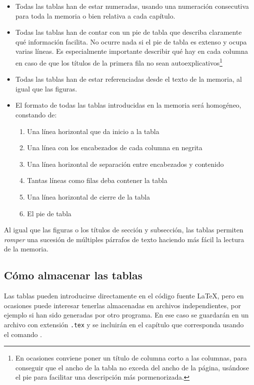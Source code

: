 \begin{itemize}
    \item Todas las tablas han de estar numeradas, usando una numeración consecutiva para toda la memoria o bien relativa a cada capítulo.
    
    \item Todas las tablas han de contar con un pie de tabla que describa claramente qué información facilita. No ocurre nada si el pie de tabla es extenso y ocupa varias líneas. Es especialmente importante describir qué hay en cada columna en caso de que los títulos de la primera fila no sean autoexplicativos\footnote{En ocasiones conviene poner un título de columna corto a las columnas, para conseguir que el ancho de la tabla no exceda del ancho de la página, usándose el pie para facilitar una descripción más pormenorizada.}
    
    \item Todas las tablas han de estar referenciadas desde el texto de la memoria, al igual que las figuras.
    
    \item El formato de todas las tablas introducidas en la memoria será homogéneo, constando de:
    \begin{enumerate}
        \item Una línea horizontal que da inicio a la tabla
        \item Una línea con los encabezados de cada columna en negrita
        \item Una línea horizontal de separación entre encabezados y contenido
        \item Tantas líneas como filas deba contener la tabla
        \item Una línea horizontal de cierre de la tabla
        \item El pie de tabla
    \end{enumerate}
\end{itemize}

Al igual que las figuras o los títulos de sección y subsección, las tablas permiten \textit{romper} una sucesión de múltiples párrafos de texto haciendo más fácil la lectura de la memoria.

\subsection{Cómo almacenar las tablas}

Las tablas pueden introducirse directamente en el código fuente \LaTeX, pero en ocasiones puede interesar tenerlas almacenadas en archivos independientes, por ejemplo si han sido generadas por otro programa. En ese caso se guardarán en un archivo con extensión \texttt{.tex} y se incluirán en el capítulo que corresponda usando el comando \verb||.

